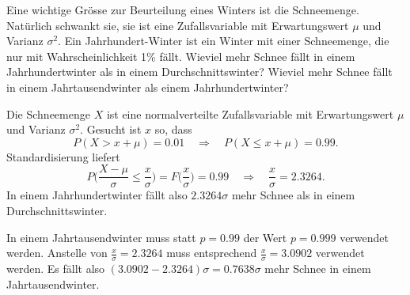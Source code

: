 Eine wichtige Grösse zur Beurteilung eines Winters ist die Schneemenge.
Natürlich schwankt sie, sie ist eine Zufallsvariable mit
Erwartungswert $\mu$ und Varianz $\sigma^2$.
Ein Jahrhundert-Winter ist ein Winter mit einer Schneemenge, die nur
mit Wahrscheinlichkeit 1\% fällt. Wieviel mehr Schnee fällt in einem
Jahrhundertwinter als in einem Durchschnittswinter? Wieviel mehr
Schnee fällt in einem Jahrtausendwinter als einem Jahrhundertwinter?


\begin{loesung}
Die Schneemenge $X$ ist eine normalverteilte Zufallsvariable mit
Erwartungswert $\mu$ und Varianz $\sigma^2$. Gesucht ist $x$ so,
dass
\[ 
P(X > x+\mu) = 0.01\quad\Rightarrow\quad
P(X\le x+\mu) =0.99.
\]
Standardisierung liefert
\[
P\biggl(\frac{X-\mu}{\sigma}\le \frac{x}{\sigma}\biggr)=F\biggl(\frac{x}{\sigma}\biggr)=0.99
\quad\Rightarrow\quad \frac{x}{\sigma}=2.3264.
\]
In einem Jahrhundertwinter fällt also $2.3264\sigma$ mehr Schnee als
in einem Durchschnittswinter.

In einem Jahrtausendwinter muss statt $p=0.99$ der Wert $p=0.999$
verwendet werden. Anstelle von $\frac{x}{\sigma}=2.3264$ muss entsprechend
$\frac{x}{\sigma}=3.0902$ verwendet
werden. Es fällt also $(3.0902-2.3264)\sigma = 0.7638\sigma$
mehr Schnee in einem Jahrtausendwinter.
\end{loesung}

